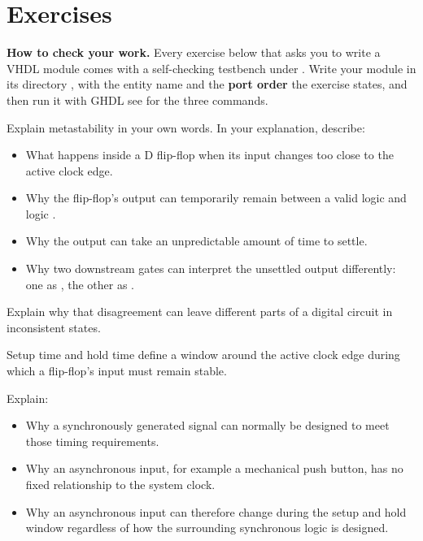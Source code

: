 
\section{Exercises}
\label{c4:sec:exercises}

\begin{aside}
\textbf{How to check your work.} Every exercise below that asks you to write a VHDL module comes
with a self-checking testbench under . Write your module in its
directory , with the entity name and the \textbf{port order} the exercise
states, and then run it with GHDL \textemdash{} see  for the three
commands.
\end{aside}


\label{c4:ex:meta}
Explain metastability in your own words. In your explanation, describe:
\begin{itemize}
  \item What happens inside a D flip-flop when its input changes too close to the active clock
    edge.
  \item Why the flip-flop's output can temporarily remain between a valid logic  and logic
    .
  \item Why the output can take an unpredictable amount of time to settle.
  \item Why two downstream gates can interpret the unsettled output differently: one as ,
    the other as .
\end{itemize}

Explain why that disagreement can leave different parts of a digital circuit in inconsistent
states.

\label{c4:ex:setup}
Setup time and hold time define a window around the active clock edge during which a flip-flop's
input must remain stable.

Explain:
\begin{itemize}
  \item Why a synchronously generated signal can normally be designed to meet those timing
    requirements.
  \item Why an asynchronous input, for example a mechanical push button, has no fixed relationship
    to the system clock.
  \item Why an asynchronous input can therefore change during the setup and hold window regardless
    of how the surrounding synchronous logic is designed.
\end{itemize}

